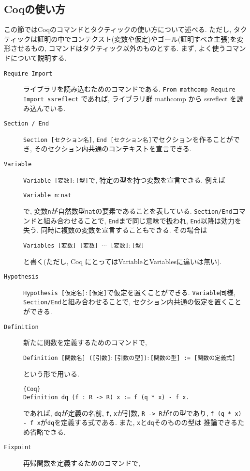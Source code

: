 \documentclass[11pt]{jsreport}
\theoremstyle{mystyle}
\newcommand{\0}{\textbf{0}}
\begin{document}
\subsection{Coqの使い方} \label{ssec coq_use}
この節ではCoqのコマンドとタクティックの使い方について述べる. ただし, タクティックは証明の中でコンテクスト(変数や仮定)やゴール(証明すべき主張)を変形させるもの, コマンドはタクティック以外のものとする. 
まず, よく使うコマンドについて説明する. 
\begin{description}
  \item[\tt Require Import]
    ライブラリを読み込むためのコマンドである.
    {\tt From mathcomp Require Import ssreflect}
    であれば, ライブラリ群 mathcomp から ssreflect を読み込んでいる.
  \item[\tt Section / End]
    {\tt Section [セクション名]}, {\tt End [セクション名]}でセクションを作ることができ, 
    そのセクション内共通のコンテキストを宣言できる. 
  \item[\tt Variable]
    {\tt Variable [変数]$\colon$[型]}で, 特定の型を持つ変数を宣言できる. 例えば
    
    {\tt Variable n$\colon$nat}
    
    で, 変数{\tt n}が自然数型{\tt nat}の要素であることを表している. 
    {\tt Section/End}コマンドと組み合わせることで, {\tt End}まで同じ意味で扱われ, 
    {\tt End}以降は効力を失う. 
    同時に複数の変数を宣言することもできる. その場合は
    
    {\tt Variables [変数] [変数] $\cdots$ [変数]$\colon$[型]}
    
    と書く(ただし, Coq にとっては{Variable}と{Variables}に違いは無い).    
  \item[\tt Hypothesis]
    {\tt Hypothesis [仮定名]$\colon$[仮定]}で仮定を置くことができる. {\tt Variable}同様, 
    {\tt Section/End}と組み合わせることで, セクション内共通の仮定を置くことができる. 
  \item[\tt Definition]
    新たに関数を定義するためのコマンドで,
    
    {\tt Definition [関数名] ([引数]$\colon$[引数の型])$\colon$[関数の型] := 
    [関数の定義式]}
    
    という形で用いる. 
    \begin{lstlisting}{Coq}
Definition dq (f : R -> R) x := f (q * x) - f x. \end{lstlisting}
    であれば, {\tt dq}が定義の名前, {\tt f}, {\tt x}が引数, {\tt R -> R}が{\tt f}の型であり, 
    {\tt f (q * x) - f x}が{\tt dq}を定義する式である. また, {\tt x}と{\tt dq}そのものの型は
    推論できるため省略できる. 
  \item[\tt Fixpoint]
    再帰関数を定義するためのコマンドで, 
    

\end{description}
\end{document}
